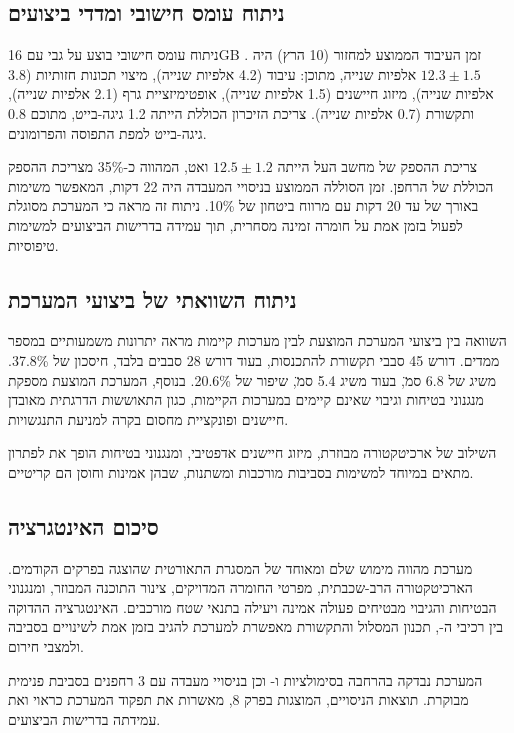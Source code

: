 \subsection{ניתוח עומס חישובי ומדדי ביצועים}
\label{sec:ch07_performance_metrics}

ניתוח עומס חישובי בוצע על גבי  עם 16GB . זמן העיבוד הממוצע למחזור  (10 הרץ) היה $12.3 \pm 1.5$ אלפיות שנייה, מתוכן: עיבוד  (4.2 אלפיות שנייה), מיצוי תכונות חזותיות (3.8 אלפיות שנייה), מיזוג חיישנים (1.5 אלפיות שנייה), אופטימיזציית גרף (2.1 אלפיות שנייה), ותקשורת (0.7 אלפיות שנייה). צריכת הזיכרון הכוללת הייתה 1.2 גיגה-בייט, מתוכם 0.8 גיגה-בייט למפת התפוסה והפרומונים.

צריכת ההספק של מחשב העל הייתה $12.5 \pm 1.2$ ואט, המהווה כ-35\% מצריכת ההספק הכוללת של הרחפן. זמן הסוללה הממוצע בניסויי המעבדה היה 22 דקות, המאפשר משימות  באורך של עד 20 דקות עם מרווח ביטחון של 10\%. ניתוח זה מראה כי המערכת מסוגלת לפעול בזמן אמת על חומרה זמינה מסחרית, תוך עמידה בדרישות הביצועים למשימות  טיפוסיות.

\subsection{ניתוח השוואתי של ביצועי המערכת}
\label{sec:ch07_comparative_analysis}

השוואה בין ביצועי המערכת המוצעת לבין מערכות קיימות מראה יתרונות משמעותיים במספר ממדים.  \cite{Lajoie2023SwarmSLAM} דורש 45 סבבי תקשורת להתכנסות, בעוד  דורש 28 סבבים בלבד, חיסכון של 37.8\%.  \cite{Xu2024D2SLAM} משיג  של 6.8 ס\"מ, בעוד  משיג 5.4 ס\"מ, שיפור של 20.6\%. בנוסף, המערכת המוצעת מספקת מנגנוני בטיחות וגיבוי שאינם קיימים במערכות הקיימות, כגון התאוששות הדרגתית מאובדן חיישנים ופונקציית מחסום בקרה למניעת התנגשויות.

השילוב של ארכיטקטורה מבוזרת, מיזוג חיישנים אדפטיבי, ומנגנוני בטיחות הופך את  לפתרון מתאים במיוחד למשימות  בסביבות מורכבות ומשתנות, שבהן אמינות וחוסן הם קריטיים.

\subsection{סיכום האינטגרציה}
\label{sec:ch07_integration_summary}

מערכת  מהווה מימוש שלם ומאוחד של המסגרת התאורטית שהוצגה בפרקים הקודמים. הארכיטקטורה הרב-שכבתית, מפרטי החומרה המדויקים, צינור התוכנה המבוזר, ומנגנוני הבטיחות והגיבוי מבטיחים פעולה אמינה ויעילה בתנאי שטח מורכבים. האינטגרציה ההדוקה בין רכיבי ה-, תכנון המסלול והתקשורת מאפשרת למערכת להגיב בזמן אמת לשינויים בסביבה ולמצבי חירום.

המערכת נבדקה בהרחבה בסימולציות  ו- וכן בניסויי מעבדה עם 3 רחפנים בסביבת  פנימית מבוקרת. תוצאות הניסויים, המוצגות בפרק 8, מאשרות את תפקוד המערכת כראוי ואת עמידתה בדרישות הביצועים.

\cite{Lajoie2023SwarmSLAM, Xu2024D2SLAM, Thrun2005Probabilistic, Kalman1960, Choudhary2017Comm, Coppola2020Swarming}
